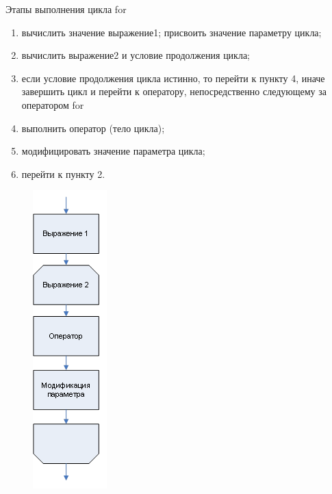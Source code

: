 \documentclass{beamer}
\begin{document}
\begin{frame}{Этапы выполнения цикла for}
\begin{minipage}{0.6\textwidth}
\begin{flushleft}
\begin{enumerate}
\item вычислить значение выражение1; присвоить значение параметру цикла;
\item вычислить выражение2 и условие продолжения цикла;
\item если условие продолжения цикла истинно, то перейти к пункту 4, иначе завершить цикл и перейти к оператору, непосредственно следующему за оператором for
\item выполнить оператор (тело цикла);
\item модифицировать значение параметра цикла;
\item перейти к пункту 2.
\end{enumerate}
\end{flushleft}
\end{minipage}
\begin{minipage}{0.2\textwidth}
\begin{flushright}
\begin{figure}[h]
\includegraphics[scale=0.7]{images/lec04-pic04.png}
\end{figure}
\end{flushright}
\end{minipage}
\end{frame}
\end{document}
